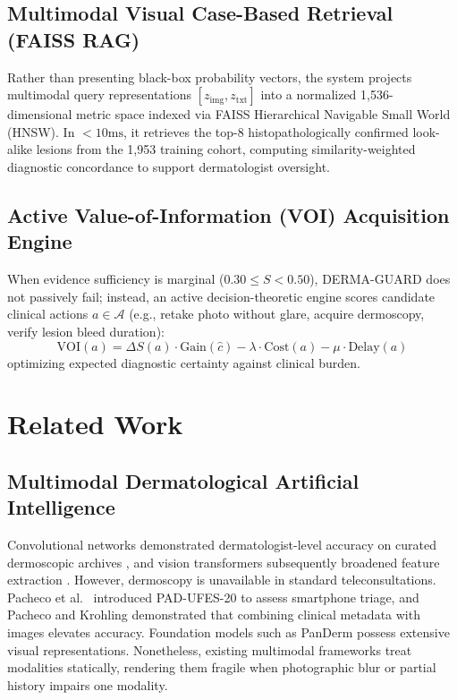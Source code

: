 \documentclass[conference]{IEEEtran}
\begin{document}
\subsection{Multimodal Visual Case-Based Retrieval (FAISS RAG)}
Rather than presenting black-box probability vectors, the system projects multimodal query representations $[z_{\text{img}}, z_{\text{txt}}]$ into a normalized 1,536-dimensional metric space indexed via FAISS Hierarchical Navigable Small World (HNSW). In $<10\text{ms}$, it retrieves the top-8 histopathologically confirmed look-alike lesions from the 1,953 training cohort, computing similarity-weighted diagnostic concordance to support dermatologist oversight.

\subsection{Active Value-of-Information (VOI) Acquisition Engine}
When evidence sufficiency is marginal ($0.30 \le S < 0.50$), DERMA-GUARD does not passively fail; instead, an active decision-theoretic engine scores candidate clinical actions $a \in \mathcal{A}$ (e.g., retake photo without glare, acquire dermoscopy, verify lesion bleed duration):
\begin{equation}
\text{VOI}(a) = \Delta S(a) \cdot \text{Gain}(\hat{c}) - \lambda \cdot \text{Cost}(a) - \mu \cdot \text{Delay}(a)
\end{equation}
optimizing expected diagnostic certainty against clinical burden.

\section{Related Work}

\subsection{Multimodal Dermatological Artificial Intelligence}
Convolutional networks demonstrated dermatologist-level accuracy on curated dermoscopic archives \cite{esteva2017dermatologist, he2016deep}, and vision transformers subsequently broadened feature extraction \cite{dosovitskiy2021image}. However, dermoscopy is unavailable in standard teleconsultations. Pacheco et al.\ \cite{pacheco2020pad} introduced PAD-UFES-20 to assess smartphone triage, and Pacheco and Krohling \cite{pacheco2021attention} demonstrated that combining clinical metadata with images elevates accuracy. Foundation models such as PanDerm \cite{yan2025multimodal} possess extensive visual representations. Nonetheless, existing multimodal frameworks treat modalities statically, rendering them fragile when photographic blur or partial history impairs one modality.
\end{document}
